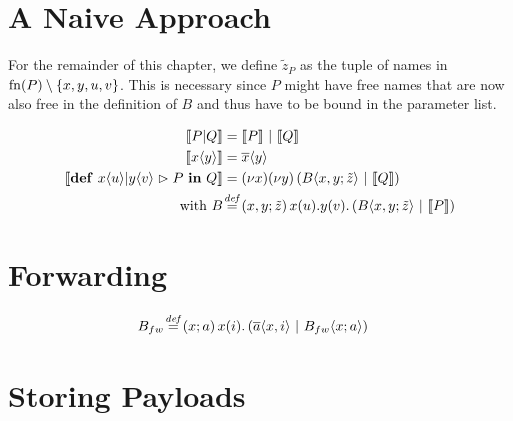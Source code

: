 \section{A Naive Approach}


For the remainder of this chapter, we define
$\tilde{z}_P$
as the tuple of names in
$\operatorname{fn}(P) \setminus {\{x, y, u, v\}}$.
This is necessary since $P$ might have free names
that are now also free in the definition of $B$ and thus
have to be bound in the parameter list.

\begin{align*}
  \encMJtoAP{P \jpar Q}
  &= \encMJtoAP{P} \apar \encMJtoAP{Q}
  \\
  \encMJtoAP{\jsnd{x}{y}}
  &= \asnd{x}{y}
  \\
  \encMJtoAP{\jdef{\jrct{\jrcv{x}{u} \jpat \jrcv{y}{v}}{P}}{Q}}
  &= \anew{x}{\anew{y}{\parens{\ains{B}{x, y}{\tilde{z}} \apar \encMJtoAP{Q}}}}
  \\
  \text{with }
  \adef*{B}{x,y}{\tilde{z}}{\arcv{x}{u} . \arcv{y}{v} . \parens{\ains{B}{x, y}{\tilde{z}} \apar \encMJtoAP{P}}}
  \\
\end{align*}



\section{Forwarding}



\begin{align*}
  \adef*{B_{fw}}{x}{a}{\arcv{x}{i} . \parens{\asnd{a}{x,i} \apar \ains{B_{fw}}{x}{a}}}
\end{align*}

\section{Storing Payloads}


